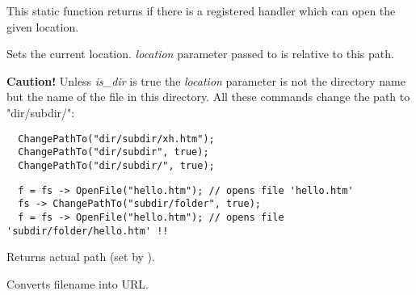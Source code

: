 
This static function returns \true if there is a registered handler which can open the given
location.


\label{wxfilesystemchangepathto}


Sets the current location. {\it location} parameter passed to 
 is relative to this path.

{\bf Caution! } Unless {\it is\_dir} is true the {\it location} parameter
is not the directory name but the name of the file in this directory. All these
commands change the path to "dir/subdir/":

\begin{verbatim}
  ChangePathTo("dir/subdir/xh.htm");
  ChangePathTo("dir/subdir", true);
  ChangePathTo("dir/subdir/", true);
\end{verbatim}





\begin{verbatim}
  f = fs -> OpenFile("hello.htm"); // opens file 'hello.htm'
  fs -> ChangePathTo("subdir/folder", true);
  f = fs -> OpenFile("hello.htm"); // opens file 'subdir/folder/hello.htm' !!
\end{verbatim}


\label{wxfilesystemgetpath}


Returns actual path (set by ).


\label{wxfilesystemfilenametourl}


Converts filename into URL.


